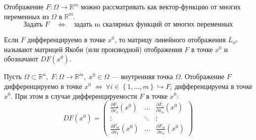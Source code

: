 \documentclass[11pt]{article}
\begin{document}
\begin{remark}
    Отображение $F \colon \Omega \to \mathbb{R}^m$ можно рассматривать как вектор-функцию от многих переменных из $\Omega$ в $\mathbb{R}^m$.
    \[ \text{Задать } F \quad \Longleftrightarrow \quad \text{задать m скалярных функций от многих переменных}\]
\end{remark}

\begin{definition}
    Если $F$ дифференцируемо в точке $x^0$, то матрицу линейного отображения $L_{x^0}$ называют
    матрицей Якоби (или производной) отображения $F$ в точке $x^0$ и обозначают $DF\left(x^0\right)$. 
\end{definition}

\begin{lemma}
    Пусть $\Omega \subset \mathbb{R}^n, \; F \colon \Omega \to \mathbb{R}^m, \; x^0 \in \Omega$ --- внутренняя точка $\Omega$. 
    Отображение $F$ дифференцируемо в точке $x^0$ $\iff \ \forall i \in \left\{1, \dots, m\right\}
    \hookrightarrow F_i$ дифференцируема в точке $x^0$. При этом в случае дифференцируемости $F$ в точке $x^0$:
    \[ DF(x^0) = \begin{pmatrix}
        \displaystyle \frac{\partial F_1}{\partial x_1}\left(x^0\right) & \dots & \displaystyle \frac{\partial F_1}{\partial x_n}\left(x^0\right) \\
        \vdots & \ddots & \vdots \\ 
        \displaystyle \frac{\partial F_m}{\partial x_1}\left(x^0\right) & \dots & \displaystyle \frac{\partial F_m}{\partial x_n}\left(x^0\right)
    \end{pmatrix}
    \]
\end{lemma}
\end{document}
